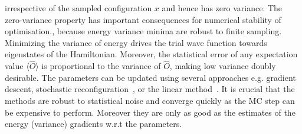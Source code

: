 irrespective of the sampled configuration $x$ and hence has zero variance. The zero-variance property has important consequences for numerical stability of optimisation., because energy variance minima are robust to finite sampling. Minimizing the variance of energy drives the trial wave function towards eigenstates of the Hamiltonian. Moreover, the statistical error of any expectation value $\langle \hat{O} \rangle$ is proportional to the variance of $\hat{O}$, making low variance doubly desirable. The parameters can be updated using several approaches e.g. gradient descent, stochastic reconfiguration~\cite{sorella1998green}, or the linear method~\cite{nightingale2001optimization}. It is crucial that the methods are robust to statistical noise and converge quickly as the MC step can be expensive to perform. Moreover they are only as good as the estimates of the energy (variance) gradients w.r.t the parameters.

